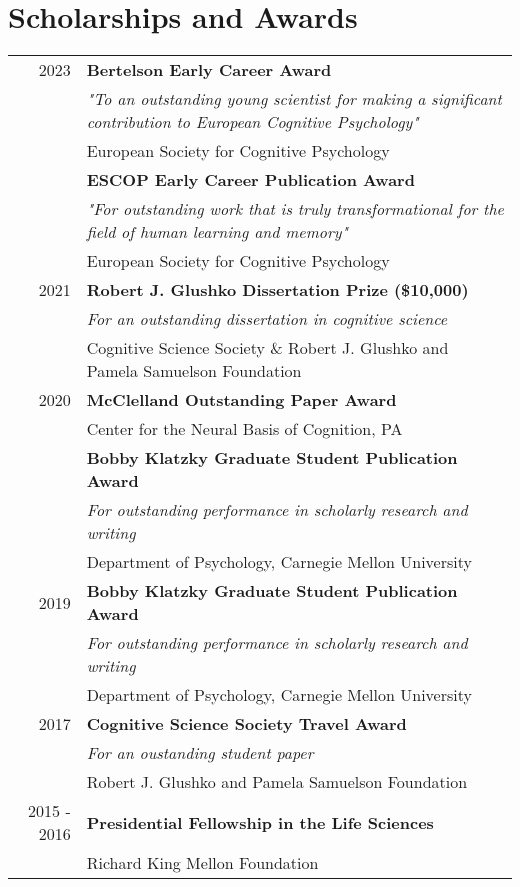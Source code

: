 \documentclass[letterpaper]{article}
\begin{document}
\section*{Scholarships and Awards}
\begin{longtable}{rl}
	2023 & \textbf{Bertelson Early Career Award}\\
    & {\it "To an outstanding young scientist for making a significant contribution to European Cognitive Psychology"} \\
	& European Society for Cognitive Psychology\\[6pt]
    
 & \textbf{ESCOP Early Career Publication Award}\\
	& {\it "For outstanding work that is truly transformational for the field of human learning and memory"}\\
	& European Society for Cognitive Psychology\\[6pt]
	2021 & \textbf{Robert J. Glushko Dissertation Prize (\$10,000)}\\
	& {\it For an outstanding dissertation in cognitive science}\\
	& Cognitive Science Society \& Robert J. Glushko and Pamela Samuelson Foundation\\[6pt]
	2020 & \textbf{McClelland Outstanding Paper Award}\\
	& Center for the Neural Basis of Cognition, PA\\[6pt]
	& \textbf{Bobby Klatzky Graduate Student Publication Award}\\
	& {\it For outstanding performance in scholarly research and writing}\\
	& Department of Psychology, Carnegie Mellon University \\[6pt]
	2019 & \textbf{Bobby Klatzky Graduate Student Publication Award}\\
	& {\it For outstanding performance in scholarly research and writing}\\
	& Department of Psychology, Carnegie Mellon University \\[6pt]
	2017 & \textbf{Cognitive Science Society Travel Award} \\
	&   {\it For an oustanding student paper}\\
	& Robert J. Glushko and Pamela Samuelson Foundation\\[6pt]
	2015 - 2016 & \textbf{Presidential Fellowship in the Life Sciences}\\
	& Richard King Mellon Foundation\\[6pt]

\end{longtable}
\end{document}
